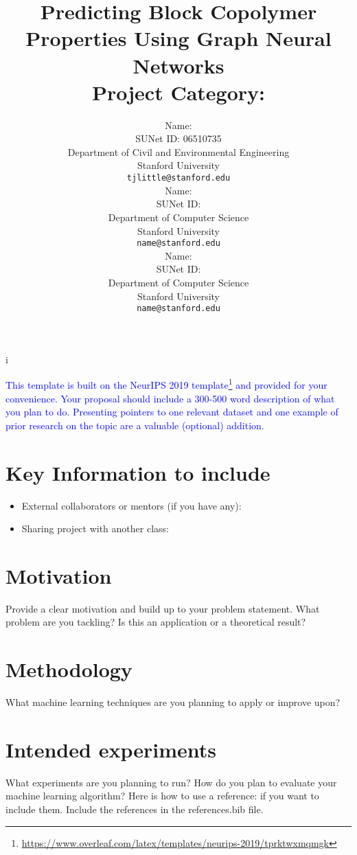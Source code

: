 i\documentclass{article}
\title{
  Predicting Block Copolymer Properties Using Graph Neural Networks \\
  \vspace{1em}
  \small{Project Category:} \\
}
\author{
  Name: \\
  SUNet ID: 06510735\\
  Department of Civil and Environmental Engineering \\
  Stanford University \\
  \texttt{tjlittle@stanford.edu} \\
  \And
  Name: \\
  SUNet ID: \\
  Department of Computer Science \\
  Stanford University \\
  \texttt{name@stanford.edu} \\
  \And
  Name: \\
  SUNet ID: \\
  Department of Computer Science \\
  Stanford University \\
  \texttt{name@stanford.edu}
}
\newcommand{\note}[1]{\textcolor{blue}{{#1}}}
\begin{document}
\maketitle



\note{This template is built on the NeurIPS 2019 template\footnote{\url{https://www.overleaf.com/latex/templates/neurips-2019/tprktwxmqmgk}} and provided for your convenience. Your proposal should include a 300-500 word description of what you plan to do. Presenting pointers to one relevant dataset and one example of prior research on the topic are a valuable (optional) addition.}

\section{Key Information to include}

\begin{itemize}
    \item External collaborators or mentors (if you have any):
    \item Sharing project with another class:
\end{itemize}

\section{Motivation}
Provide a clear motivation and build up to your problem statement. What problem are you tackling? Is this an application or a theoretical result?

\section{Methodology}
What machine learning techniques are you planning to apply or improve upon?

\section{Intended experiments}
What experiments are you planning to run? How do you plan to evaluate your machine learning algorithm? Here is how to use a reference: \cite{attention_vaswani_17} if you want to include them. Include the references in the references.bib file.



\end{document}
